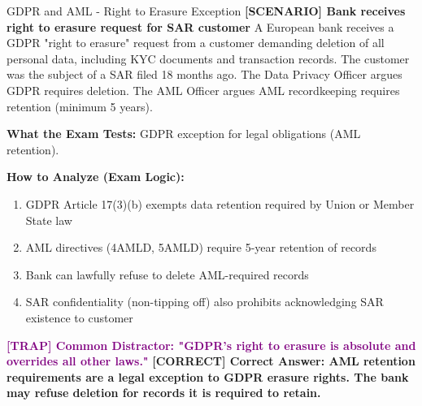 \documentclass[11pt,a4paper]{beamer}
\newcommand{\trap}[1]{\textcolor{purple}{\textbf{[TRAP] #1}}}
\newcommand{\correct}[1]{\textcolor{green!50!black}{\textbf{[CORRECT] #1}}}
\newcommand{\scenario}[1]{\textcolor{blue!70!black}{\textbf{[SCENARIO] #1}}}
\begin{document}
\begin{frame}{GDPR and AML - Right to Erasure Exception}
	\scenario{Bank receives right to erasure request for SAR customer}
	A European bank receives a GDPR "right to erasure" request from a customer demanding deletion of all personal data, including KYC documents and transaction records. The customer was the subject of a SAR filed 18 months ago. The Data Privacy Officer argues GDPR requires deletion. The AML Officer argues AML recordkeeping requires retention (minimum 5 years).
	
	\vspace{0.1cm}
	\textbf{What the Exam Tests:} GDPR exception for legal obligations (AML retention).
	
	\vspace{0.1cm}
	\textbf{How to Analyze (Exam Logic):}
	\begin{enumerate}
		\item GDPR Article 17(3)(b) exempts data retention required by Union or Member State law
		\item AML directives (4AMLD, 5AMLD) require 5-year retention of records
		\item Bank can lawfully refuse to delete AML-required records
		\item SAR confidentiality (non-tipping off) also prohibits acknowledging SAR existence to customer
	\end{enumerate}
	
	\trap{Common Distractor: "GDPR's right to erasure is absolute and overrides all other laws."}
	\correct{Correct Answer: AML retention requirements are a legal exception to GDPR erasure rights. The bank may refuse deletion for records it is required to retain.}
\end{frame}
\end{document}
